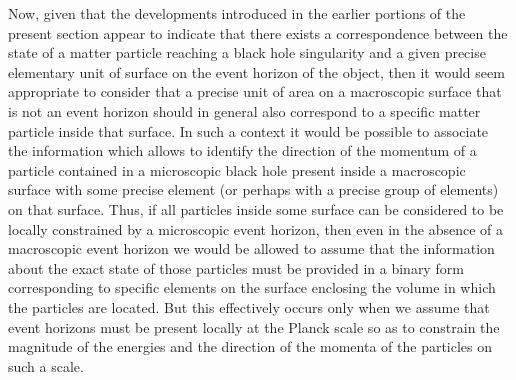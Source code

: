 \documentclass[notitlepage,12pt]{report}
\begin{document}
Now, given that the developments introduced in the earlier portions of the present section appear to indicate that there exists a correspondence between the state of a matter particle reaching a black hole singularity and a given precise elementary unit of surface on the event horizon of the object, then it would seem appropriate to consider that a precise unit of area on a macroscopic surface that is not an event horizon should in general also correspond to a specific matter particle inside that surface. In such a context it would be possible to associate the information which allows to identify the direction of the momentum of a particle contained in a microscopic black hole present inside a macroscopic surface with some precise element (or perhaps with a precise group of elements) on that surface. Thus, if all particles inside some surface can be considered to be locally constrained by a microscopic event horizon, then even in the absence of a macroscopic event horizon we would be allowed to assume that the information about the exact state of those particles must be provided in a binary form corresponding to specific elements on the surface enclosing the volume in which the particles are located. But this effectively occurs only when we assume that event horizons must be present locally at the Planck scale so as to constrain the magnitude of the energies and the direction of the momenta of the particles on such a scale.
\end{document}

